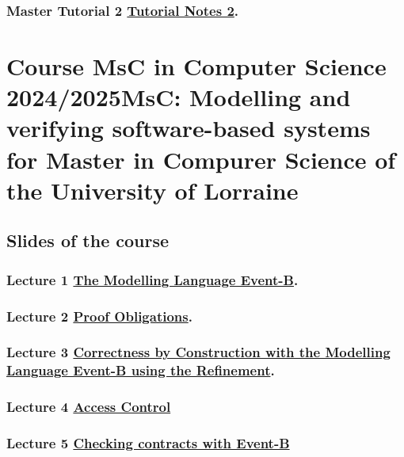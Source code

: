 \documentclass[ 12pt]{article}
\begin{document}
\subsubsection{Master Tutorial  2
    \href{http://mery54.github.io/teaching/mosos/lecturesnotes/mastertutorial2.pdf}{Tutorial
      Notes 2}.}
\label{sec:tuthrefhttp:mb}






\section{Course  MsC in Computer Science 2024/2025MsC:  Modelling and verifying software-based systems for
  Master in Compurer Science of the University of Lorraine}
\label{sec:course-modell-verify}


\subsection{Slides of the course}
\label{sec:slides-course}

\subsubsection{Lecture 1 
  \href{http://mery54.github.io/teaching/mosos/lecturesnotes/masterillect1-1.pdf}{The 
    Modelling Language Event-B}.}

  
\subsubsection{ Lecture 2 
    \href{http://mery54.github.io/teaching/mosos/lecturesnotes/masterillect1-2.pdf}{Proof 
      Obligations}.}

\subsubsection{Lecture 3 
    \href{http://mery54.github.io/teaching/mosos/lecturesnotes/masterillect2.pdf}{Correctness by Construction with the  
      Modelling Language Event-B using the Refinement}.}

  \subsubsection{ Lecture 4 
    \href{http://mery54.github.io/teaching/mosos/lecturesnotes/masterillect3.pdf}{Access 
      Control }}


\subsubsection{ Lecture 5
    \href{http://mery54.github.io/teaching/mosos/lecturesnotes/masterillect-verification.pdf}{Checking contracts with Event-B}}
\end{document}
